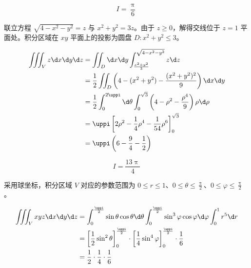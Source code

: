 \begin{solution}
    \begin{equation}
        I = \boxed{\frac{\uppi}{6}}
    \end{equation}

    联立方程 $\sqrt{4-x^{2}-y^{2}}=z$ 与 $x^{2}+y^{2}=3 z$。由于 $z \geqslant 0$，解得交线位于 $z=1$ 平面处。积分区域在 $xy$ 平面上的投影为圆盘 $D: x^2+y^2 \leqslant 3$。

    \begin{equation}
        \begin{aligned}
            \iiint_{V} z \d x \d y \d z & = \iint_{D} \d x \d y \int_{\frac{x^2+y^2}{3}}^{\sqrt{4-x^2-y^2}} z \d z                                                 \\
                                        & = \frac{1}{2} \iint_{D} \left( 4 - (x^2 + y^2) - \frac{(x^2+y^2)^2}{9} \right) \d x \d y                                 \\
                                        & = \frac{1}{2} \int_{0}^{2 \uppi} \d \theta \int_{0}^{\sqrt{3}} \left( 4 - \rho^2 - \frac{\rho^4}{9} \right) \rho \d \rho \\
                                        & = \uppi \left[ 2 \rho^2 - \frac{1}{4} \rho^4 - \frac{1}{54} \rho^6 \right]_{0}^{\sqrt{3}}                                \\
                                        & = \uppi \left( 6 - \frac{9}{4} - \frac{1}{2} \right) \label{eq:I3}
        \end{aligned}
    \end{equation}

    \begin{equation}
        I = \boxed{\frac{13 \uppi}{4}}
    \end{equation}

    采用球坐标，积分区域 $V$ 对应的参数范围为 $0 \leqslant r \leqslant 1$、$0 \leqslant \theta \leqslant \frac{\uppi}{2}$、$0 \leqslant \varphi \leqslant \frac{\uppi}{2}$。

    \begin{equation}
        \begin{aligned}
            \iiint_{V} x y z \d x \d y \d z & = \int_{0}^{\frac{\uppi}{2}} \sin \theta \cos \theta \d \theta \int_{0}^{\frac{\uppi}{2}} \sin^3 \varphi \cos \varphi \d \varphi \int_{0}^{1} r^5 \d r   \\
                                            & = \left[ \frac{1}{2} \sin^2 \theta \right]_{0}^{\frac{\uppi}{2}} \cdot \left[ \frac{1}{4} \sin^4 \varphi \right]_{0}^{\frac{\uppi}{2}} \cdot \frac{1}{6} \\
                                            & = \frac{1}{2} \cdot \frac{1}{4} \cdot \frac{1}{6} \label{eq:I4}
        \end{aligned}
    \end{equation}


\end{solution}
